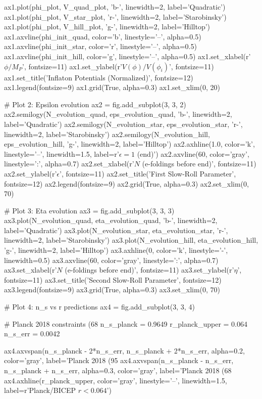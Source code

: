 \documentclass[a4paper, 11pt]{article}
\begin{document}
\begin{pycode}
ax1.plot(phi_plot, V_quad_plot, 'b-', linewidth=2, label='Quadratic')
ax1.plot(phi_plot, V_star_plot, 'r-', linewidth=2, label='Starobinsky')
ax1.plot(phi_plot, V_hill_plot, 'g-', linewidth=2, label='Hilltop')
ax1.axvline(phi_init_quad, color='b', linestyle='--', alpha=0.5)
ax1.axvline(phi_init_star, color='r', linestyle='--', alpha=0.5)
ax1.axvline(phi_init_hill, color='g', linestyle='--', alpha=0.5)
ax1.set_xlabel(r'$\phi/M_P$', fontsize=11)
ax1.set_ylabel(r'$V(\phi)/V(\phi_i)$', fontsize=11)
ax1.set_title('Inflaton Potentials (Normalized)', fontsize=12)
ax1.legend(fontsize=9)
ax1.grid(True, alpha=0.3)
ax1.set_xlim(0, 20)

# Plot 2: Epsilon evolution
ax2 = fig.add_subplot(3, 3, 2)
ax2.semilogy(N_evolution_quad, eps_evolution_quad, 'b-', linewidth=2, label='Quadratic')
ax2.semilogy(N_evolution_star, eps_evolution_star, 'r-', linewidth=2, label='Starobinsky')
ax2.semilogy(N_evolution_hill, eps_evolution_hill, 'g-', linewidth=2, label='Hilltop')
ax2.axhline(1.0, color='k', linestyle='--', linewidth=1.5, label=r'$\epsilon=1$ (end)')
ax2.axvline(60, color='gray', linestyle=':', alpha=0.7)
ax2.set_xlabel(r'$N$ (e-foldings before end)', fontsize=11)
ax2.set_ylabel(r'$\epsilon$', fontsize=11)
ax2.set_title('First Slow-Roll Parameter', fontsize=12)
ax2.legend(fontsize=9)
ax2.grid(True, alpha=0.3)
ax2.set_xlim(0, 70)

# Plot 3: Eta evolution
ax3 = fig.add_subplot(3, 3, 3)
ax3.plot(N_evolution_quad, eta_evolution_quad, 'b-', linewidth=2, label='Quadratic')
ax3.plot(N_evolution_star, eta_evolution_star, 'r-', linewidth=2, label='Starobinsky')
ax3.plot(N_evolution_hill, eta_evolution_hill, 'g-', linewidth=2, label='Hilltop')
ax3.axhline(0, color='k', linestyle='-', linewidth=0.5)
ax3.axvline(60, color='gray', linestyle=':', alpha=0.7)
ax3.set_xlabel(r'$N$ (e-foldings before end)', fontsize=11)
ax3.set_ylabel(r'$\eta$', fontsize=11)
ax3.set_title('Second Slow-Roll Parameter', fontsize=12)
ax3.legend(fontsize=9)
ax3.grid(True, alpha=0.3)
ax3.set_xlim(0, 70)

# Plot 4: n_s vs r predictions
ax4 = fig.add_subplot(3, 3, 4)

# Planck 2018 constraints (68%
n_s_planck = 0.9649
r_planck_upper = 0.064
n_s_err = 0.0042

ax4.axvspan(n_s_planck - 2*n_s_err, n_s_planck + 2*n_s_err,
            alpha=0.2, color='gray', label='Planck 2018 (95%
ax4.axvspan(n_s_planck - n_s_err, n_s_planck + n_s_err,
            alpha=0.3, color='gray', label='Planck 2018 (68%
ax4.axhline(r_planck_upper, color='gray', linestyle='--', linewidth=1.5,
            label=r'Planck/BICEP $r<0.064$')


\end{pycode}
\end{document}
